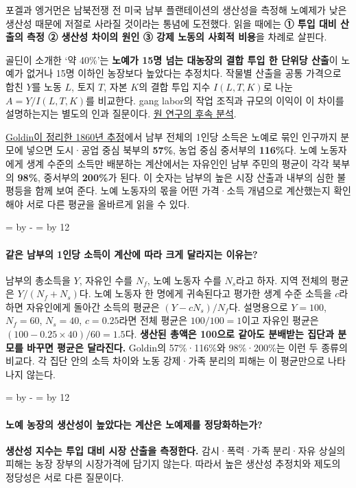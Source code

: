 \documentclass[10pt,a4paper]{article}
\newcommand{\ReserveQuestionSpace}{%
  \par\begingroup
  \dimen0=\pagegoal \advance\dimen0 by -\pagetotal
  \dimen2=\baselineskip \multiply\dimen2 by 12
  \ifdim\dimen0<\dimen2 \newpage\fi
  \endgroup}
\begin{document}
포겔과 엥거먼은 남북전쟁 전 미국 남부 플랜테이션의 생산성을 측정해 노예제가 낮은 생산성 때문에 저절로 사라질 것이라는 통념에 도전했다. 읽을 때에는 \textbf{① 투입 대비 산출의 측정 ② 생산성 차이의 원인 ③ 강제 노동의 사회적 비용}을 차례로 살핀다.\par

골딘이 소개한 ‘약 40\%’는 \textbf{노예가 15명 넘는 대농장의 결합 투입 한 단위당 산출}이 노예가 없거나 15명 이하인 농장보다 높았다는 추정치다. 작물별 산출을 공통 가격으로 합친 $Y$를 노동 $L$, 토지 $T$, 자본 $K$의 결합 투입 지수 $I(L,T,K)$로 나눈 $A=Y/I(L,T,K)$를 비교한다. gang labor의 작업 조직과 규모의 이익이 이 차이를 설명하는지는 별도의 인과 질문이다. \href{https://ideas.repec.org/a/aea/aecrev/v67y1977i3p275-96.html}{원 연구의 후속 분석}.\par

\href{https://goldin.scholars.harvard.edu/sites/g/files/omnuum5966/files/goldin/files/cliometrics.pdf}{Goldin이 정리한 1860년 추정}에서 남부 전체의 1인당 소득은 노예로 묶인 인구까지 분모에 넣으면 도시·공업 중심 북부의 \textbf{57\%}, 농업 중심 중서부의 \textbf{116\%}다. 노예 노동자에게 생계 수준의 소득만 배분하는 계산에서는 자유인인 남부 주민의 평균이 각각 북부의 \textbf{98\%}, 중서부의 \textbf{200\%}가 된다. 이 숫자는 남부의 높은 시장 산출과 내부의 심한 불평등을 함께 보여 준다. 노예 노동자의 몫을 어떤 가격·소득 개념으로 계산했는지 확인해야 서로 다른 평균을 올바르게 읽을 수 있다.\par

\ReserveQuestionSpace
\paragraph{같은 남부의 1인당 소득이 계산에 따라 크게 달라지는 이유는?}
남부의 총소득을 $Y$, 자유인 수를 $N_f$, 노예 노동자 수를 $N_s$라고 하자. 지역 전체의 평균은 $Y/(N_f+N_s)$다. 노예 노동자 한 명에게 귀속된다고 평가한 생계 수준 소득을 $c$라 하면 자유인에게 돌아간 소득의 평균은 $(Y-cN_s)/N_f$다. 설명용으로 $Y=100$, $N_f=60$, $N_s=40$, $c=0.25$라면 전체 평균은 $100/100=1$이고 자유인 평균은 $(100-0.25\times40)/60=1.5$다. \textbf{생산된 총액은 100으로 같아도 분배받는 집단과 분모를 바꾸면 평균은 달라진다.} Goldin의 57\%·116\%와 98\%·200\%는 이런 두 종류의 비교다. 각 집단 안의 소득 차이와 노동 강제·가족 분리의 피해는 이 평균만으로 나타나지 않는다.\par

\ReserveQuestionSpace
\paragraph{노예 농장의 생산성이 높았다는 계산은 노예제를 정당화하는가?}
\textbf{생산성 지수는 투입 대비 시장 산출을 측정한다.} 감시·폭력·가족 분리·자유 상실의 피해는 농장 장부의 시장가격에 담기지 않는다. 따라서 높은 생산성 추정치와 제도의 정당성은 서로 다른 질문이다.\par
\end{document}
